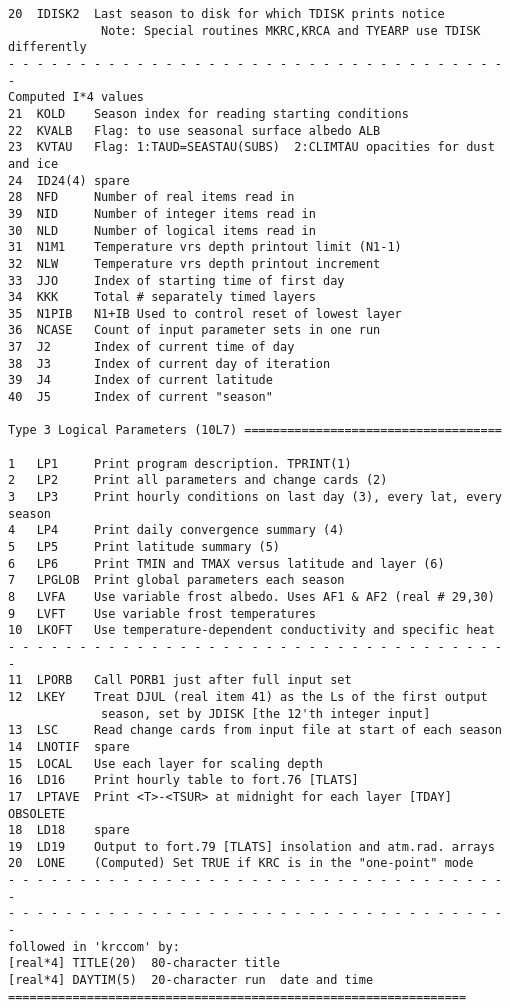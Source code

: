 \documentclass[draft]{article}  %
\begin{document}
\begin{verbatim}
20  IDISK2  Last season to disk for which TDISK prints notice
             Note: Special routines MKRC,KRCA and TYEARP use TDISK differently
- - - - - - - - - - - - - - - - - - - - - - - - - - - - - - - - - - - - 
Computed I*4 values
21  KOLD    Season index for reading starting conditions
22  KVALB   Flag: to use seasonal surface albedo ALB
23  KVTAU   Flag: 1:TAUD=SEASTAU(SUBS)  2:CLIMTAU opacities for dust and ice
24  ID24(4) spare
28  NFD     Number of real items read in
39  NID     Number of integer items read in
30  NLD     Number of logical items read in
31  N1M1    Temperature vrs depth printout limit (N1-1)
32  NLW     Temperature vrs depth printout increment
33  JJO     Index of starting time of first day
34  KKK     Total # separately timed layers
35  N1PIB   N1+IB Used to control reset of lowest layer
36  NCASE   Count of input parameter sets in one run
37  J2      Index of current time of day
38  J3      Index of current day of iteration
39  J4      Index of current latitude
40  J5      Index of current "season"

Type 3 Logical Parameters (10L7) ====================================

1   LP1     Print program description. TPRINT(1) 
2   LP2     Print all parameters and change cards (2)
3   LP3     Print hourly conditions on last day (3), every lat, every season
4   LP4     Print daily convergence summary (4)
5   LP5     Print latitude summary (5)
6   LP6     Print TMIN and TMAX versus latitude and layer (6)
7   LPGLOB  Print global parameters each season
8   LVFA    Use variable frost albedo. Uses AF1 & AF2 (real # 29,30)
9   LVFT    Use variable frost temperatures
10  LKOFT   Use temperature-dependent conductivity and specific heat
- - - - - - - - - - - - - - - - - - - - - - - - - - - - - - - - - - - - 
11  LPORB   Call PORB1 just after full input set
12  LKEY    Treat DJUL (real item 41) as the Ls of the first output
             season, set by JDISK [the 12'th integer input]
13  LSC     Read change cards from input file at start of each season
14  LNOTIF  spare
15  LOCAL   Use each layer for scaling depth
16  LD16    Print hourly table to fort.76 [TLATS] 
17  LPTAVE  Print <T>-<TSUR> at midnight for each layer [TDAY] OBSOLETE
18  LD18    spare
19  LD19    Output to fort.79 [TLATS] insolation and atm.rad. arrays 
20  LONE    (Computed) Set TRUE if KRC is in the "one-point" mode
- - - - - - - - - - - - - - - - - - - - - - - - - - - - - - - - - - - - 
- - - - - - - - - - - - - - - - - - - - - - - - - - - - - - - - - - - - 
followed in 'krccom' by: 
[real*4] TITLE(20)	80-character title
[real*4] DAYTIM(5)	20-character run  date and time
================================================================


\end{verbatim}
\end{document}
